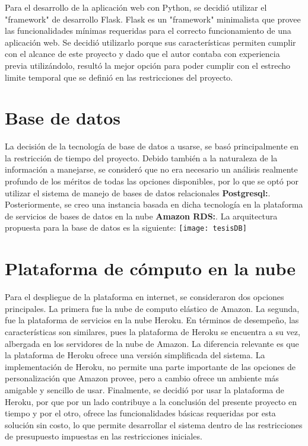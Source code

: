 		Para el desarrollo de la aplicación web con Python, se decidió utilizar el "framework" de desarrollo Flask. Flask es un "framework" minimalista que provee las funcionalidades mínimas requeridas para el correcto funcionamiento de una aplicación web. Se decidió utilizarlo porque sus características permiten cumplir con el alcance de este proyecto y dado que el autor contaba con experiencia previa utilizándolo, resultó la mejor opción para poder cumplir con el estrecho limite temporal que se definió en las restricciones del proyecto.

	\section{Base de datos}
		La decisión de la tecnología de base de datos a usarse, se basó principalmente en la restricción de tiempo del proyecto. Debido también a la naturaleza de la información a manejarse, se consideró que no era necesario un análisis realmente profundo de los méritos de todas las opciones disponibles, por lo que se optó por utilizar el sistema de manejo de bases de datos relacionales \textbf{Postgresql:}. Posteriormente, se creo una instancia basada en dicha tecnología en la plataforma de servicios de bases de datos en la nube \textbf{Amazon RDS:}.
		La arquitectura propuesta para la base de datos es la siguiente:
		\texttt{[image: tesisDB]}

	\section{Plataforma de cómputo en la nube}
		Para el despliegue de la plataforma en internet, se consideraron dos opciones principales. La primera fue la nube de computo elástico de Amazon. La segunda, fue la plataforma de servicios en la nube Heroku. En términos de desempeño, las características son similares, pues la plataforma de Heroku se encuentra a su vez, albergada en los servidores de la nube de Amazon. La diferencia relevante es que la plataforma de Heroku ofrece una versión simplificada del sistema. La implementación de Heroku, no permite una parte importante de las opciones de personalización que Amazon provee, pero a cambio ofrece un ambiente más amigable y sencillo de usar. Finalmente, se decidió por usar la plataforma de Heroku, por que por un lado contribuye a la conclusión del presente proyecto en tiempo y por el otro, ofrece las funcionalidades básicas requeridas por esta solución sin costo, lo que permite desarrollar el sistema dentro de las restricciones de presupuesto impuestas en las restricciones iniciales.

